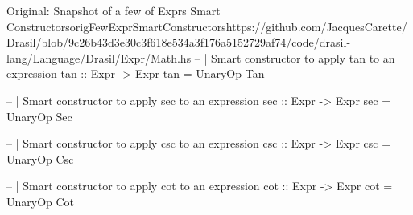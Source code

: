 \begin{haskell}{Original: Snapshot of a few of Exprs Smart Constructors}{origFewExprSmartConstructors}{https://github.com/JacquesCarette/Drasil/blob/9c26b43d3e30c3f618e534a3f176a5152729af74/code/drasil-lang/Language/Drasil/Expr/Math.hs}
-- | Smart constructor to apply tan to an expression
tan :: Expr -> Expr
tan = UnaryOp Tan

-- | Smart constructor to apply sec to an expression
sec :: Expr -> Expr 
sec = UnaryOp Sec

-- | Smart constructor to apply csc to an expression
csc :: Expr -> Expr
csc = UnaryOp Csc

-- | Smart constructor to apply cot to an expression
cot :: Expr -> Expr 
cot = UnaryOp Cot
\end{haskell}
